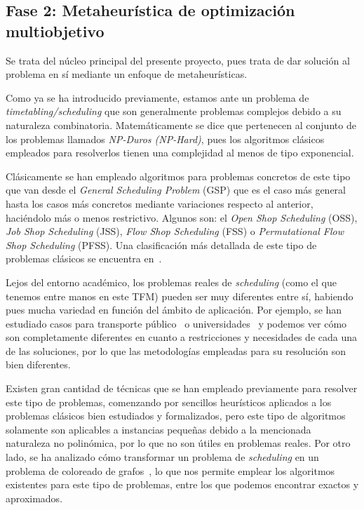 \subsection{Fase 2: Metaheurística de optimización multiobjetivo} \label{sec:3:metaheurística}
Se trata del núcleo principal del presente proyecto, pues trata de dar solución al problema en sí mediante un enfoque de metaheurísticas.

Como ya se ha introducido previamente, estamos ante un problema de \textit{timetabling/scheduling} que son generalmente problemas complejos debido a su naturaleza combinatoria.
Matemáticamente se dice que pertenecen al conjunto de los problemas llamados \textit{NP-Duros (NP-Hard)}, pues los algoritmos clásicos empleados para resolverlos tienen una complejidad al menos de tipo exponencial.

Clásicamente se han empleado algoritmos para problemas concretos de este tipo que van desde el \textit{General Scheduling Problem} (GSP) que es el caso más general hasta los casos más concretos mediante variaciones respecto al anterior, haciéndolo más o menos restrictivo.
Algunos son: el \textit{Open Shop Scheduling} (OSS), \textit{Job Shop Scheduling} (JSS), \textit{Flow Shop Scheduling} (FSS) o \textit{Permutational Flow Shop Scheduling} (PFSS). Una clasificación más detallada de este tipo de problemas clásicos se encuentra en~\cite{sota:tesis-doctoral}.

Lejos del entorno académico, los problemas reales de \textit{scheduling} (como el que tenemos entre manos en este TFM) pueden ser muy diferentes entre sí, habiendo pues mucha variedad en función del ámbito de aplicación.
Por ejemplo, se han estudiado casos para transporte público~\cite{sota:transporte-publico} o universidades~\cite{sota:universidad} y podemos ver cómo son completamente diferentes en cuanto a restricciones y necesidades de cada una de las soluciones, por lo que las metodologías empleadas para su resolución son bien diferentes.

Existen gran cantidad de técnicas que se han empleado previamente para resolver este tipo de problemas, comenzando por sencillos heurísticos aplicados a los problemas clásicos bien estudiados y formalizados, pero este tipo de algoritmos solamente son aplicables a instancias pequeñas debido a la mencionada naturaleza no polinómica, por lo que no son útiles en problemas reales. Por otro lado, se ha analizado cómo transformar un problema de \textit{scheduling} en un problema de coloreado de grafos~\cite{sota:estudio-coloreado-grafos, sota:algotimo-coloreado-grafos}, lo que nos permite emplear los algoritmos existentes para este tipo de problemas, entre los que podemos encontrar exactos y aproximados.

